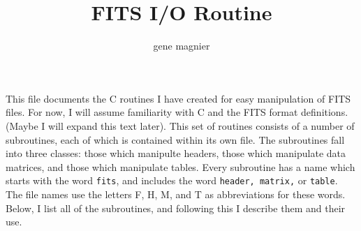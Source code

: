 
\title{FITS I/O Routine}
\author{gene magnier}


\maketitle

        This file documents the C routines I have created for easy
manipulation of FITS files.  For now, I will assume familiarity with C
and the FITS format definitions.  (Maybe I will expand this text
later).  This set of routines consists of a number of subroutines,
each of which is contained within its own file.  The subroutines fall into
three classes: those which manipulte headers, those which manipulate
data matrices, and those which manipulate tables.  Every subroutine
has a name which starts with the word {\tt fits}, and includes the word
{\tt header, matrix,} or {\tt table}.  The file names use the letters
F, H, M, and T as abbreviations for these words.  Below, I list all of
the subroutines, and following this I describe them and their use.   

